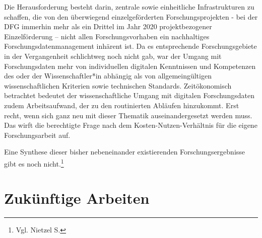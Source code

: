 Die Herausforderung besteht darin, zentrale sowie einheitliche Infrastrukturen zu schaffen, die von den überwiegend einzelgeförderten Forschungsprojekten - bei der DFG immerhin mehr als ein Drittel im Jahr 2020 projektbezogener Einzelförderung – nicht allen Forschungsvorhaben ein nachhaltiges Forschungsdatenmanagement inhärent ist. Da es entsprechende Forschungsgebiete in der Vergangenheit schlichtweg noch nicht gab, war der Umgang mit Forschungsdaten mehr von individuellen digitalen Kenntnissen und Kompetenzen des oder der Wissenschaftler*in abhängig als von allgemeingültigen wissenschaftlichen Kriterien sowie technischen Standards. Zeitökonomisch betrachtet bedeutet der wissenschaftliche Umgang mit digitalen Forschungsdaten zudem Arbeitsaufwand, der zu den routinierten Abläufen hinzukommt. Erst recht, wenn sich ganz neu mit dieser Thematik auseinandergesetzt werden muss. Das wirft die berechtigte Frage nach dem Kosten-Nutzen-Verhältnis für die eigene Forschungsarbeit auf.

Eine Synthese dieser bisher nebeneinander existierenden Forschungsergebnisse gibt es noch nicht.\footnote{Vgl. Nietzel S.}

\section{Zukünftige Arbeiten}